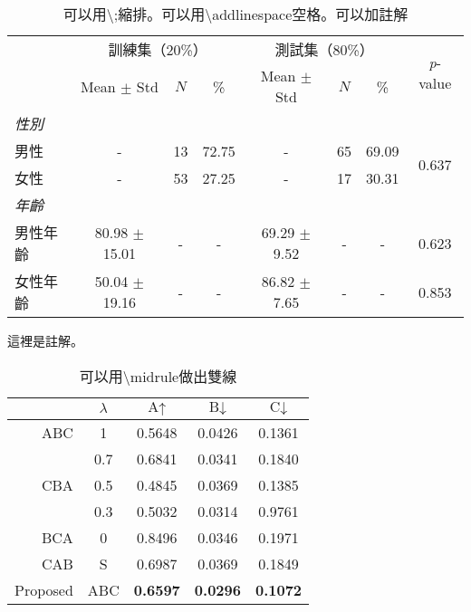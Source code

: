 \begin{table}[!htb]
    \centering
    \caption{可以用\textbackslash ;縮排。可以用\textbackslash addlinespace空格。可以加註解}
    \label{tab:tab3}
    \begin{threeparttable}
        \begin{tabularx}{\textwidth}{lccccccc}
            \toprule
            & \multicolumn{3}{c}{訓練集（20\%）} & \multicolumn{3}{c}{測試集（80\%）} & \multirow{2}{*}{\textit{p}-value} \\
            \cmidrule(lr){2-4} \cmidrule(lr){5-7}
            & Mean $\pm$ Std & $N$ & \% & Mean $\pm$ Std & $N$ & \% \\
            \midrule
            \textit{性別} \\
            \; 男性 & - & 13 & 72.75 & - & 65 & 69.09 & \multirow{2}{*}{0.637} \\
            \; 女性 & - & 53 & 27.25 & - & 17 & 30.31 & \\
            \addlinespace
            \textit{年齡} \\
            \; 男性年齡 & 80.98 $\pm$ 15.01 & - & - & 69.29 $\pm$ 9.52 & - & - & 0.623 \\
            \; 女性年齡 & 50.04 $\pm$ 19.16 & - & - & 86.82 $\pm$ 7.65 & - & - & 0.853 \\
            \bottomrule
        \end{tabularx}
        \begin{tablenotes}
            \footnotesize
            \item 這裡是註解。
        \end{tablenotes}
    \end{threeparttable}
\end{table}

\begin{table}[!htb]
    \centering
    \caption{可以用\textbackslash midrule做出雙線}
    \label{tab:tab4}
    \begin{tabular}{rcccc}
        \toprule
        & $\lambda$ & $\text{A}\uparrow$ & $\text{B}\downarrow$ & $\text{C}\downarrow$ \\
        \midrule
        ABC & 1 & 0.5648 & 0.0426 & 0.1361 \\
        \multirow{3}{*}{CBA} & 0.7 & 0.6841 & 0.0341 & 0.1840 \\
        & 0.5 & 0.4845 & 0.0369 & 0.1385 \\
        & 0.3 & 0.5032 & 0.0314 & 0.9761 \\
        BCA & 0 & 0.8496 & 0.0346 & 0.1971 \\
        CAB & S & 0.6987 & 0.0369 & 0.1849 \\
        \midrule \midrule
        Proposed & ABC & \textbf{0.6597} & \textbf{0.0296} & \textbf{0.1072} \\
        \bottomrule
    \end{tabular}
\end{table}

